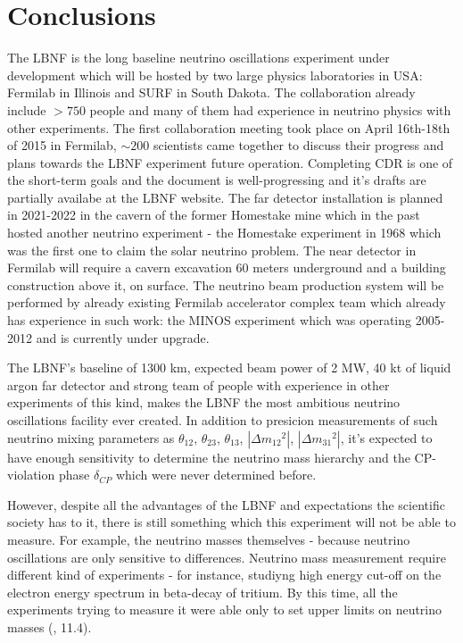 \section{Conclusions}
The LBNF is the long baseline neutrino oscillations experiment under development which will be hosted by two large physics laboratories in USA: Fermilab in Illinois and SURF in South Dakota. The collaboration already include $>750$ people and many of them had experience in neutrino physics with other experiments. The first collaboration meeting took place on April 16th-18th of 2015 in Fermilab, $\sim 200$ scientists came together to discuss their progress and plans towards the LBNF experiment future operation. Completing CDR is one of the short-term goals and the document is well-progressing and it's drafts are partially availabe at the LBNF website. The far detector installation is planned in 2021-2022 in the cavern of the former Homestake mine which in the past hosted another neutrino experiment - the Homestake experiment in 1968 which was the first one to claim the solar neutrino problem. The near detector in Fermilab will require a cavern excavation 60 meters underground and a building construction above it, on surface. The neutrino beam production system will be performed by already existing Fermilab accelerator complex team which already has experience in such work: the MINOS experiment which was operating 2005-2012 and is currently under upgrade.      

The LBNF's baseline of 1300 km, expected beam power of 2 MW, 40 kt of liquid argon far detector and strong team of people with experience in other experiments of this kind, makes the LBNF the most ambitious neutrino oscillations facility ever created. In addition to presicion measurements of such neutrino mixing parameters as $\theta_{12}$, $\theta_{23}$, $\theta_{13}$, $|\Delta{m_{12}}^2|$, $|\Delta{m_{31}}^2|$, it's expected to have enough sensitivity to determine the neutrino mass hierarchy and the CP-violation phase $\delta_{CP}$ which were never determined before.

However, despite all the advantages of the LBNF and expectations the scientific society has to it, there is still something which this experiment will not be able to measure. For example, the neutrino masses themselves - because neutrino oscillations are only sensitive to differences. Neutrino mass measurement require different kind of experiments - for instance, studiyng high energy cut-off on the electron energy spectrum in beta-decay of tritium. By this time, all the experiments trying to measure it were able only to set upper limits on neutrino masses (\cite{ref_Griffiths}, 11.4).  
